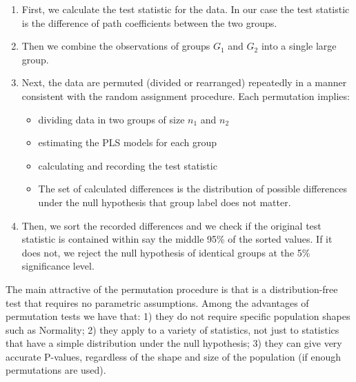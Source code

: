 \documentclass[12pt]{book}\usepackage{graphicx, color}
\begin{document}
\begin{enumerate}
 \item First, we calculate the test statistic for the data. In our case the test statistic is the difference of path coefficients between the two groups.
 \item Then we combine the observations of groups $G_1$ and $G_2$ into a single large group.
 \item Next, the data are permuted (divided or rearranged) repeatedly in a manner consistent with the random assignment procedure. Each permutation implies:
 \begin{itemize}
  \item dividing data in two groups of size $n_1$ and $n_2$
  \item estimating the PLS models for each group
  \item calculating and recording the test statistic
  \item[] The set of calculated differences is the distribution of possible differences
under the null hypothesis that group label does not matter.
 \end{itemize}
 \item Then, we sort the recorded differences and we check if the original test statistic is contained within say the middle 95\% of the sorted values. If it does not, we reject the null hypothesis of identical groups at the 5\% significance level.
\end{enumerate}

The main attractive of the permutation procedure is that is a distribution-free test that requires no parametric assumptions. Among the advantages of permutation tests we have that: 1) they do not require specific population shapes such as Normality; 2) they apply to a variety of statistics, not just to statistics that have a simple distribution under the null hypothesis; 3) they can give very accurate P-values, regardless of the shape and size of the population (if enough permutations are used).
\end{document}
